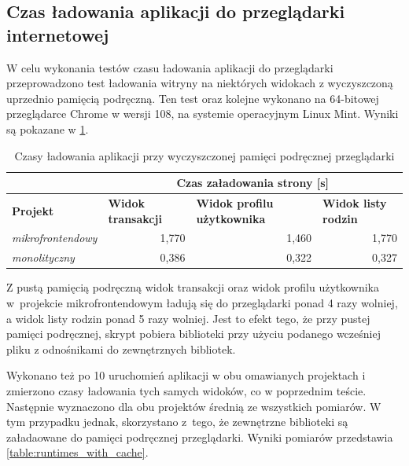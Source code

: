 \documentclass{SGGW-thesis}
\begin{document}
{    \subsection{Czas ładowania aplikacji do przeglądarki internetowej}
    W celu wykonania testów czasu ładowania aplikacji do przeglądarki przeprowadzono test ładowania witryny na niektórych widokach z wyczyszczoną uprzednio pamięcią podręczną. Ten test oraz kolejne wykonano na 64-bitowej przeglądarce Chrome w wersji 108, na systemie operacyjnym Linux Mint. Wyniki są pokazane w \cref{table:runtimes_without_cache}.

    \begin{table}[h]
      \centering
      \caption{Czasy ładowania aplikacji przy wyczyszczonej pamięci podręcznej przeglądarki}
      \begin{tabular}{l|rrr|}
      \cline{2-4}
       & \multicolumn{3}{c|}{\textbf{Czas załadowania strony {[}s{]}}} \\ \hline
      \multicolumn{1}{|l|}{\textbf{Projekt}} & \multicolumn{1}{l|}{\textbf{Widok transakcji}} & \multicolumn{1}{l|}{\textbf{Widok profilu użytkownika}} & \multicolumn{1}{l|}{\textbf{Widok listy rodzin}} \\ \hline
      \multicolumn{1}{|l|}{\textit{mikrofrontendowy}} & \multicolumn{1}{r|}{1,770} & \multicolumn{1}{r|}{1,460} & 1,770 \\ \hline
      \multicolumn{1}{|l|}{\textit{monolityczny}} & \multicolumn{1}{r|}{0,386} & \multicolumn{1}{r|}{0,322} & 0,327 \\ \hline
      \end{tabular}
      \label{table:runtimes_without_cache}
    \end{table}

    Z pustą pamięcią podręczną widok transakcji oraz widok profilu użytkownika w~projekcie mikrofrontendowym ładują się do przeglądarki ponad 4 razy wolniej, a widok listy rodzin ponad 5 razy wolniej. Jest to efekt tego, że przy pustej pamięci podręcznej, skrypt pobiera biblioteki przy użyciu podanego wcześniej pliku z odnośnikami do zewnętrznych bibliotek.

    Wykonano też po 10 uruchomień aplikacji w obu omawianych projektach i zmierzono czasy ładowania tych samych widoków, co w poprzednim teście. Następnie wyznaczono dla obu projektów średnią ze wszystkich pomiarów. W tym przypadku jednak, skorzystano z~tego, że zewnętrzne biblioteki są załadaowane do pamięci podręcznej przeglądarki. Wyniki pomiarów przedstawia \cref{table:runtimes_with_cache}.
    
}
\end{document}
